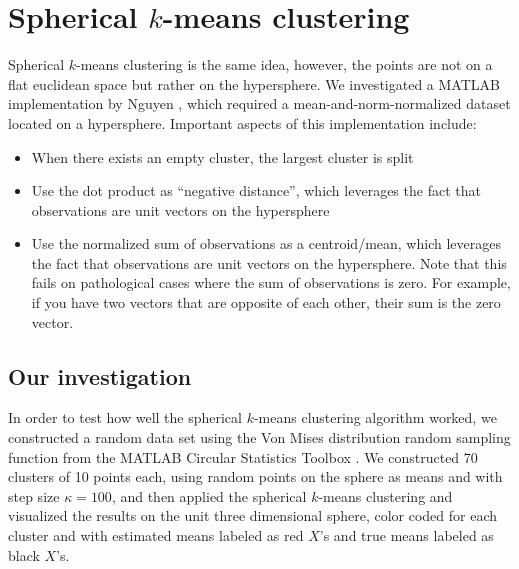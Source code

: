 \documentclass[../tech_report_1.tex]{subfiles}
\begin{document}
\section{Spherical $k$-means clustering}

Spherical $k$-means clustering is the same idea, however, the points are not on a flat euclidean space but rather on the hypersphere.
We investigated a MATLAB implementation by Nguyen  \cite{nguyen2008gene,nguyen_spherical_clustering},
which required a mean-and-norm-normalized dataset located on a hypersphere.
Important aspects of this implementation include:
\begin{itemize}
\item When there exists an empty cluster, the largest cluster is split
\item Use the dot product as ``negative distance'', which leverages the
fact that observations are unit vectors on the hypersphere
\item Use the normalized sum of observations as a centroid/mean, which leverages
the fact that observations are unit vectors on the hypersphere. Note
that this fails on pathological cases where the sum of observations
is zero.
For example, if you have two vectors that are opposite of each other, their sum is the zero vector.
\end{itemize}

\subsection{Our investigation}

In order to test how well the spherical $k$-means clustering algorithm
worked, we constructed a random data set using the Von Mises distribution
random sampling function from the MATLAB Circular Statistics Toolbox  \cite{circstats}.
We constructed 70 clusters of 10 points each, using random points
on the sphere as means and with step size $\kappa=100$, and then applied the spherical $k$-means clustering and visualized the results on the unit
three dimensional sphere, color coded for each cluster and with estimated
means labeled as red $X$'s and true means labeled as black $X$'s.


\end{document}
